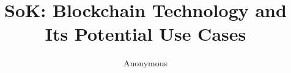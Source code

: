 \documentclass[10pt, conference, compsocconf]{IEEEtran}
\begin{document}
\title{SoK: Blockchain Technology and Its Potential Use Cases}

\author{
	Anonymous
%
%
%	
%
%
%	
%	
}

\maketitle



\IEEEpeerreviewmaketitle
\thispagestyle{plain}
\pagestyle{plain}












%
%






\end{document}
